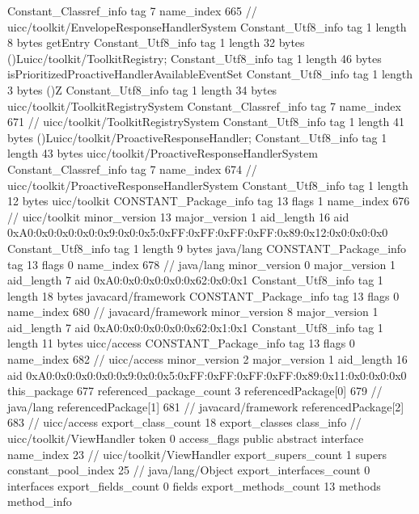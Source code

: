 {{{		}
		Constant_Classref_info {
			tag	7
			name_index	665		// uicc/toolkit/EnvelopeResponseHandlerSystem
		}
		Constant_Utf8_info {
			tag	1
			length	8
			bytes	getEntry
		}
		Constant_Utf8_info {
			tag	1
			length	32
			bytes	()Luicc/toolkit/ToolkitRegistry;
		}
		Constant_Utf8_info {
			tag	1
			length	46
			bytes	isPrioritizedProactiveHandlerAvailableEventSet
		}
		Constant_Utf8_info {
			tag	1
			length	3
			bytes	()Z
		}
		Constant_Utf8_info {
			tag	1
			length	34
			bytes	uicc/toolkit/ToolkitRegistrySystem
		}
		Constant_Classref_info {
			tag	7
			name_index	671		// uicc/toolkit/ToolkitRegistrySystem
		}
		Constant_Utf8_info {
			tag	1
			length	41
			bytes	()Luicc/toolkit/ProactiveResponseHandler;
		}
		Constant_Utf8_info {
			tag	1
			length	43
			bytes	uicc/toolkit/ProactiveResponseHandlerSystem
		}
		Constant_Classref_info {
			tag	7
			name_index	674		// uicc/toolkit/ProactiveResponseHandlerSystem
		}
		Constant_Utf8_info {
			tag	1
			length	12
			bytes	uicc/toolkit
		}
		CONSTANT_Package_info {
			tag	13
			flags	1
			name_index	676		// uicc/toolkit
			minor_version	13
			major_version	1
			aid_length	16
			aid	0xA0:0x0:0x0:0x0:0x9:0x0:0x5:0xFF:0xFF:0xFF:0xFF:0x89:0x12:0x0:0x0:0x0
		}
		Constant_Utf8_info {
			tag	1
			length	9
			bytes	java/lang
		}
		CONSTANT_Package_info {
			tag	13
			flags	0
			name_index	678		// java/lang
			minor_version	0
			major_version	1
			aid_length	7
			aid	0xA0:0x0:0x0:0x0:0x62:0x0:0x1
		}
		Constant_Utf8_info {
			tag	1
			length	18
			bytes	javacard/framework
		}
		CONSTANT_Package_info {
			tag	13
			flags	0
			name_index	680		// javacard/framework
			minor_version	8
			major_version	1
			aid_length	7
			aid	0xA0:0x0:0x0:0x0:0x62:0x1:0x1
		}
		Constant_Utf8_info {
			tag	1
			length	11
			bytes	uicc/access
		}
		CONSTANT_Package_info {
			tag	13
			flags	0
			name_index	682		// uicc/access
			minor_version	2
			major_version	1
			aid_length	16
			aid	0xA0:0x0:0x0:0x0:0x9:0x0:0x5:0xFF:0xFF:0xFF:0xFF:0x89:0x11:0x0:0x0:0x0
		}
	}
	this_package	677
	referenced_package_count	3
	referencedPackage[0]	679		// java/lang
	referencedPackage[1]	681		// javacard/framework
	referencedPackage[2]	683		// uicc/access
	export_class_count	18
	export_classes {
		class_info {		// uicc/toolkit/ViewHandler
			token	0
			access_flags	public abstract interface
			name_index	23		// uicc/toolkit/ViewHandler
			export_supers_count	1
			supers {
				constant_pool_index	25		// java/lang/Object
			}
			export_interfaces_count	0
			interfaces {
			}
			export_fields_count	0
			fields {
			}
			export_methods_count	13
			methods {
				method_info {
}}}}}
